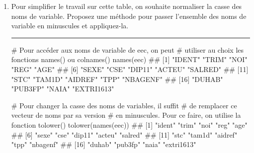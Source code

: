 \documentclass[12pt,twosided, notitlepage]{book}
\newenvironment{Shaded}{}{}
\newcommand{\KeywordTok}[1]{\textcolor[rgb]{0.00,0.00,1.00}{{#1}}}
\newcommand{\CommentTok}[1]{\textcolor[rgb]{0.00,0.50,0.00}{{#1}}}
\newcommand{\NormalTok}[1]{{#1}}
\newif \ifsol
\renewenvironment{Shaded}{\begin{snugshade}}{\end{snugshade}}
\begin{document}
\begin{enumerate}
  \begin{center} \rule{0.5\linewidth}{\linethickness}\end{center}

  \bigskip  \fi 
\item
  Pour simplifier le travail sur cette table, on souhaite normaliser la
  casse des noms de variable. Proposez une méthode pour passer
  l'ensemble des noms de variable en minuscules et
  appliquez-la.

  \ifsol  \textbf{Indication} Pensez à utiliser les fonctions
  \texttt{names()} et \texttt{tolower()}.\fi 

  \ifsol 

  \begin{center} \rule{0.5\linewidth}{\linethickness}\end{center}

\begin{Shaded}
\begin{Highlighting}[]
\CommentTok{# Pour accéder aux noms de variable de eec, on peut}
\CommentTok{# utiliser au choix les fonctions names() ou colnames()}
\KeywordTok{names}\NormalTok{(eec)}
  \NormalTok{##  [1] "IDENT"     "TRIM"      "NOI"       "REG"       "AGE"      }
  \NormalTok{##  [6] "SEXE"      "CSE"       "DIP11"     "ACTEU"     "SALRED"   }
  \NormalTok{## [11] "STC"       "TAM1D"     "AIDREF"    "TPP"       "NBAGENF"  }
  \NormalTok{## [16] "DUHAB"     "PUB3FP"    "NAIA"      "EXTRI1613"}

\CommentTok{# Pour changer la casse des noms de variables, il suffit}
\CommentTok{# de remplacer ce vecteur de noms par sa version }
\CommentTok{# en minuscules. Pour ce faire, on utilise la fonction tolower()}
\KeywordTok{tolower}\NormalTok{(}\KeywordTok{names}\NormalTok{(eec))}
  \NormalTok{##  [1] "ident"     "trim"      "noi"       "reg"       "age"      }
  \NormalTok{##  [6] "sexe"      "cse"       "dip11"     "acteu"     "salred"   }
  \NormalTok{## [11] "stc"       "tam1d"     "aidref"    "tpp"       "nbagenf"  }
  \NormalTok{## [16] "duhab"     "pub3fp"    "naia"      "extri1613"}


\end{Highlighting}
\end{Shaded}
\end{enumerate}
\end{document}
